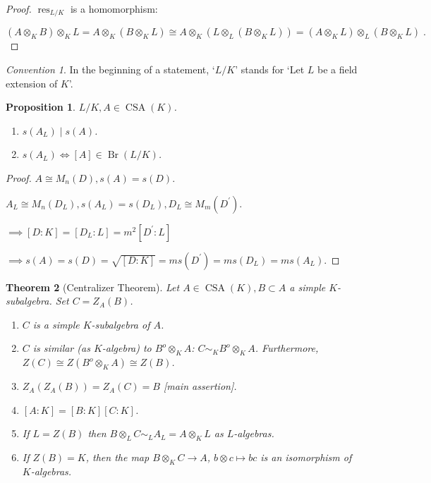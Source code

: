 \documentclass{article}
\theoremstyle{definition}
\theoremstyle{plain}
\newtheorem{theorem}{Theorem}[section]
\newtheorem{proposition}[theorem]{Proposition}
\theoremstyle{remark}
\newtheorem*{convention*}{Convention}
\begin{document}
    \begin{proof}
        \(\operatorname{res}_{L / K}\) is a homomorphism:

        \[
            (A \otimes_K B) \otimes_K L= A \otimes_K (B \otimes_K L) \cong A \otimes_K (L \otimes_L (B \otimes_K L)) = (A \otimes_K L) \otimes_L (B \otimes_K L)\;.
        \]
    \end{proof}

    \begin{convention*}
        In the beginning of a statement, `\(L / K\)' stands for `Let \(L\) be a field extension of \(K\)'.
    \end{convention*}

    \begin{proposition}
        \(L / K, A \in \operatorname{CSA}(K)\).
        
        \begin{enumerate}[label=\roman*)]
            \item \(s(A_L) \mid s(A)\). 
            \item \(s(A_L) \iff [A] \in \operatorname{Br}(L / K)\).
        \end{enumerate} 
    \end{proposition}

    \begin{proof}
        \(A\cong M_n(D), s(A) = s(D)\).

        \(A_L \cong M_n(D_L), s(A_L) = s(D_L), D_L \cong M_m(D^{\prime})\).

        \(\implies [D:K] = [D_L:L] = m^2[D^{\prime} : L]\)

        \(\implies s(A)=s(D)=\sqrt{[D:K]} = ms(D^{\prime}) = ms(D_L) = ms(A_L)\).
    \end{proof}

    \begin{theorem}
        [Centralizer Theorem]

        Let \(A \in \operatorname{CSA}(K), B \subset A\) a simple \(K\)-subalgebra. Set \( C = Z_A(B)\).

        \begin{enumerate}[label=\roman*)]
            \item \(C\) is a simple \(K\)-subalgebra of \(A\).
            \item \(C\) is similar (as \(K\)-algebra) to \(B^{o} \otimes_K A\): \(C \sim_K B^o \otimes_K A\). Furthermore, \(Z(C) \cong Z(B^o \otimes_K A) \cong Z(B)\).
            \item \(Z_A(Z_A(B)) = Z_A(C) = B\) [main assertion].
            \item \([A:K] = [B:K][C:K]\).
            \item If \(L = Z(B)\) then \(B \otimes_L C \sim_L A_L = A \otimes_K L\) as \(L\)-algebras.
            \item If \(Z(B) = K\), then the map \(B \otimes_K C \to A\), \(b \otimes c \mapsto bc\) is an isomorphism of \(K\)-algebras.  
        \end{enumerate} 
    \end{theorem}
\end{document}
